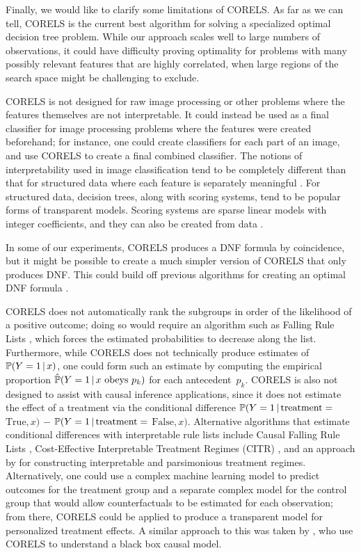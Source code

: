 \begin{arxiv}

Finally, we would like to clarify some limitations of CORELS.
%
As far as we can tell, CORELS is the current best algorithm for solving a
specialized optimal decision tree problem.
%
While our approach scales well to large numbers of observations,
it could have difficulty proving optimality
for problems with many possibly relevant features that are highly correlated,
when large regions of the search space might be challenging to exclude.

CORELS is not designed for raw image processing or other problems where the
features themselves are not interpretable.
%
It could instead be used as a final classifier for image processing problems
where the features were created beforehand; for instance, one could create classifiers
for each part of an image, and use CORELS to create a final combined classifier. The notions of interpretability used in image classification tend to be completely different than that for structured data where each feature is separately meaningful \citep[e.g., see][]{LiEtAl18}. For structured data, decision trees, along with scoring systems, tend to be popular forms of transparent models. Scoring systems are sparse linear models with integer coefficients, and they can also be created from data \citep{UstunRu2017KDD,UstunRu2016SLIM}. 

In some of our experiments, CORELS produces a DNF formula by coincidence, but it might be possible to create a much simpler version of CORELS that only produces DNF. This could build off previous algorithms for creating an optimal DNF formula \citep{Rijnbeek10,WangEtAl16,WangEtAl2017}.

CORELS does not automatically rank the subgroups in order of the likelihood of a
positive outcome; doing so would require an algorithm such as Falling Rule Lists \citep{WangRu15,ChenRu18}, which forces the estimated probabilities to decrease along the list.
%
Furthermore, while CORELS does not technically produce estimates of ${\mathbb{P}(Y=1 \,|\, x)}$,
one could form such an estimate by computing the empirical
proportion ${\hat{\mathbb{P}}(Y=1 \,|\, x \textrm{ obeys } p_k)}$ for each antecedent~$p_k$.
%
CORELS is also not designed to assist with causal inference applications, since
it does not estimate the effect of a treatment via the conditional difference
${\mathbb{P}(Y=1 \,|\, \textrm{treatment} =}$ ${\textrm{True}, x)}$ $-$
${\mathbb{P}(Y=1 \,|\, \textrm{treatment} =}$ ${\textrm{False}, x)}$.
%
Alternative algorithms that estimate conditional differences with interpretable
rule lists include Causal Falling Rule Lists \citep{WangRu15CFRL},
Cost-Effective Interpretable Treatment Regimes (CITR) \citep{LakkarajuRu17},
and an approach by \citet{ZhangEtAl15} for constructing
interpretable and parsimonious treatment regimes. Alternatively, one could use a complex machine learning model to predict outcomes for the treatment group and a separate complex model for the control group that would allow counterfactuals to be estimated for each observation; from there, CORELS could be applied to produce a transparent model for personalized treatment effects. A similar approach to this was taken by \citet{GohRu18causal}, who use CORELS to understand a black box causal model.
%


\end{arxiv}
